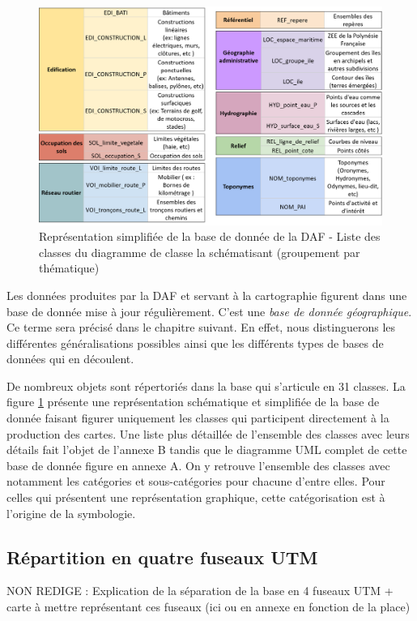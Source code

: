 \begin{figure}[ht]
\centering
\includegraphics[width=12cm]{images/chap1/bd_simplifie.png}
\caption{Représentation simplifiée de la base de donnée de la DAF - Liste des classes du diagramme de classe la schématisant (groupement par thématique)}
\label{bd_simplifie}
\end{figure}
Les données produites par la DAF et servant à la cartographie figurent dans une base de donnée mise à jour régulièrement. C'est une \textit{base de donnée géographique}. Ce terme sera précisé dans le chapitre suivant. En effet, nous distinguerons les différentes généralisations possibles ainsi que les différents types de bases de données qui en découlent. 

De nombreux objets sont répertoriés dans la base qui s'articule en 31 classes. La figure \ref{bd_simplifie} présente une représentation schématique et simplifiée de la base de donnée faisant figurer uniquement les classes qui participent directement à la production des cartes. Une liste plus détaillée de l'ensemble des classes avec leurs détails fait l'objet de l'annexe B tandis que le diagramme UML complet de cette base de donnée figure en annexe A. On y retrouve l'ensemble des classes avec notamment les catégories et sous-catégories pour chacune d'entre elles. Pour celles qui présentent une représentation graphique, cette catégorisation est à l'origine de la symbologie.

\subsection{Répartition en quatre fuseaux UTM}
{\color{magenta} NON REDIGE : Explication de la séparation de la base en 4 fuseaux UTM + carte à mettre représentant ces fuseaux (ici ou en annexe en fonction de la place)}

